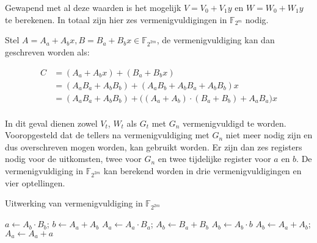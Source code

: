 Gewapend met al deze waarden is het mogelijk $V = V_0 + V_1 y$ en $W = W_0 + W_1 y$ te berekenen. In totaal zijn hier zes vermenigvuldigingen in $\mathbb{F}_{2^m}$ nodig. 

Stel $A = A_a + A_b x, B = B_a + B_b x \in \mathbb{F}_{2^{2m}}$, de vermenigvuldiging kan dan geschreven worden als:

\[\begin{aligned}
C	&= (A_a + A_b x) + (B_a + B_b x)\\
	&= (A_a B_a + A_b B_b) + (A_a B_b + A_b B_a + A_b B_b)x\\
	&= (A_a B_a + A_b B_b) + \bigl( (A_a + A_b) \cdot (B_a + B_b) + A_a B_a \bigr) x\\
\end{aligned}\]

In dit geval dienen zowel $V_t$, $W_t$ als $G_t$ met $G_n$ vermenigvuldigd te worden. Vooropgesteld dat de tellers na vermenigvuldiging met $G_n$ niet meer nodig zijn en dus overschreven mogen worden, kan  gebruikt worden. Er zijn dan zes registers nodig voor de uitkomsten, twee voor $G_n$ en twee tijdelijke register voor $a$ en $b$. De vermenigvuldiging in $\mathbb{F}_{2^{2m}}$ kan berekend worden in drie vermenigvuldigingen en vier optellingen.

\begin{algorithm}[h]
	\caption{Uitwerking van vermenigvuldiging in $\mathbb{F}_{2^{2m}}$}
	\label{algoritme-implementatie-miller-f2m-mult}
	$a \leftarrow A_b \cdot B_b$; $b \leftarrow A_a + A_b$\;
	$A_a \leftarrow A_a \cdot B_a$; $A_b \leftarrow B_a + B_b$\;
	$A_b \leftarrow A_b \cdot b$\;
	$A_b \leftarrow A_a + A_b$; $A_a \leftarrow A_a + a$\;
\end{algorithm}
